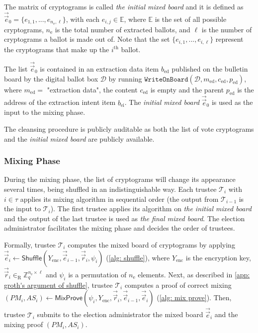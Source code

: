 The matrix of cryptograms is called \textit{the initial mixed board} and it is defined as $\vec{\vec{e}}_0 = \{ e_{1, 1}, ..., e_{n_\mathrm{e}, \ell} \}$, with each $e_{i, j} \in \mathbb{E}$, where $\mathbb{E}$ is the set of all possible cryptograms, $n_\mathrm{e}$ is the total number of extracted ballots, and $\ell$ is the number of cryptograms a ballot is made out of. Note that the set $\{ e_{i, 1}, ..., e_{i, \ell} \}$ represent the cryptograms that make up the $i^\mathrm{th}$ ballot.

The list $\vec{\vec{e}}_0$ is contained in an extraction data item $b_\mathrm{ed}$ published on the bulletin board by the digital ballot box $\mathcal{D}$ by running $\mathtt{WriteOnBoard}(\mathcal{D}, m_\mathrm{ed}, c_\mathrm{ed}, p_\mathrm{ed})$, where $m_\mathrm{ed} = $ "extraction data", the content $c_\mathrm{ed}$ is empty and the parent $p_\mathrm{ed}$ is the address of the extraction intent item $b_\mathrm{ei}$. The \textit{initial mixed board} $\vec{\vec{e}}_0$ is used as the input to the mixing phase.

The cleansing procedure is publicly auditable as both the list of vote cryptograms and the \textit{initial mixed board} are publicly available.


\subsubsection{Mixing Phase} \label{sec: mixing phase}
During the mixing phase, the list of cryptograms will change its appearance several times, being shuffled in an indistinguishable way. Each trustee $\mathcal{T}_i$ with $i \in \tau$ applies its mixing algorithm in sequential order (the output from $\mathcal{T}_{i-1}$ is the input to $\mathcal{T}_i$). The first trustee applies its algorithm on \textit{the initial mixed board} and the output of the last trustee is used as \textit{the final mixed board}. The election administrator facilitates the mixing phase and decides the order of trustees.

Formally, trustee $\mathcal{T}_i$ computes the mixed board of cryptograms by applying $\vec{\vec{e}}_i \gets \mathsf{Shuffle}(Y_\mathrm{enc}, \vec{\vec{e}}_{i-1}, \vec{\vec{r}}_i, \psi_i)$ (\cref{alg: shuffle}), where $Y_\mathrm{enc}$ is the encryption key, $\vec{\vec{r}}_i \in_\mathrm{R} \mathbb{Z}_q^{n_\mathrm{e} \times \ell}$ and $\psi_i$ is a permutation of $n_\mathrm{e}$ elements. Next, as described in \cref{app: groth's argument of shuffle}, trustee $\mathcal{T}_i$ computes a proof of correct mixing $(PM_i, AS_i) \gets \mathsf{MixProve}(\psi_i, Y_\mathrm{enc}, \vec{\vec{r}}_i, \vec{\vec{e}}_{i-1}, \vec{\vec{e}}_i)$ (\cref{alg: mix prove}). Then, trustee $\mathcal{T}_i$ submits to the election administrator the mixed board $\vec{\vec{e}}_i$ and the mixing proof $(PM_i, AS_i)$.

